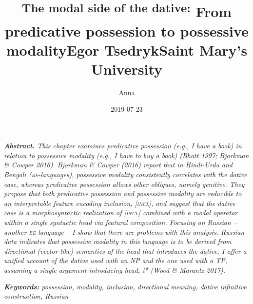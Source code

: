 \documentclass[12pt]{article}
\title{}
\author{Anna}
\date{2019-07-23}
\newenvironment{stylelsAbstract}{\setlength\leftskip{0.5in}\setlength\rightskip{0.5in}\setlength\parindent{0in}\setlength\parfillskip{0pt plus 1fil}\setlength\parskip{0in plus 1pt}\writerlistparindent\writerlistleftskip\leavevmode\normalfont\normalsize\itshape\writerlistlabel\ignorespaces}{\unskip\vspace{0.111in plus 0.0111in}\par}
\newcommand\writerlistleftskip{}
\newcommand\writerlistparindent{}
\newcommand\writerlistlabel{}
\begin{document}
\title{\textsuperscript{The modal side of the dative:} From predicative possession to possessive modality}
\maketitle

\title{Egor Tsedryk}
\maketitle

\title{Saint Mary’s University }
\maketitle

\begin{stylelsAbstract}
\textbf{Abstract.} This chapter examines predicative possession (e.g., I have a book) in relation to possessive modality (e.g., I have to buy a book) (Bhatt 1997; Bjorkman \& Cowper 2016). Bjorkman \& Cowper (2016) report that in Hindi-Urdu and Bengali (\textsc{be}{}-languages), possessive modality consistently correlates with the dative case, whereas predicative possession allows other obliques, namely genitive. They propose that both predicative possession and possessive modality are reducible to an interpretable feature encoding inclusion, [\textsc{incl}], and suggest that the dative case is a morphosyntactic realization of [\textsc{incl}] combined with a modal operator within a single syntactic head via featural composition. Focusing on Russian – another \textsc{be}{}-language – I show that there are problems with this analysis. Russian data indicates that possessive modality in this language is to be derived from directional (vector-like) semantics of the head that introduces the dative. I offer a unified account of the dative used with an NP and the one used with a TP, assuming a single argument-introducing head, i* (Wood \& Marantz 2017).
\end{stylelsAbstract}

\begin{stylelsAbstract}
\textbf{Keywords:} possession, modality, inclusion, directional meaning, dative infinitive construction, Russian
\end{stylelsAbstract}
\end{document}
